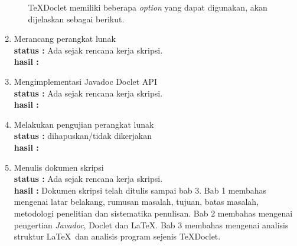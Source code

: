\documentclass[a4paper,twoside]{article}
\begin{document}
\begin{enumerate}
\begin{enumerate}
TeXDoclet memiliki beberapa {\it option} yang dapat digunakan, akan dijelaskan sebagai berikut.
		\end{enumerate}

		\item Merancang perangkat lunak\\
		{\bf status :} Ada sejak rencana kerja skripsi.\\
		{\bf hasil :}

		\item Mengimplementasi Javadoc Doclet API\\
		{\bf status :} Ada sejak rencana kerja skripsi.\\
		{\bf hasil :}

		\item Melakukan pengujian perangkat lunak\\
		{\bf status :} dihapuskan/tidak dikerjakan \\
		{\bf hasil :} 

		\item Menulis dokumen skripsi \\
		{\bf status :} Ada sejak rencana kerja skripsi.\\
		{\bf hasil :} Dokumen skripsi telah ditulis sampai bab 3. Bab 1 membahas mengenai latar belakang, rumusan masalah, tujuan, batas masalah, metodologi penelitian dan sistematika penulisan. Bab 2 membahas mengenai pengertian {\it Javadoc}, Doclet dan \LaTeX. Bab 3 membahas mengenai analisis struktur \LaTeX\ dan analisis program sejenis TeXDoclet.

	\end{enumerate}
\end{document}
